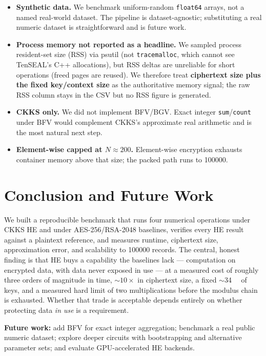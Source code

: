\documentclass[11pt,a4paper]{article}
\begin{document}
\begin{itemize}[leftmargin=1.4em,itemsep=1pt]
  \item \textbf{Synthetic data.} We benchmark uniform-random \texttt{float64}
    arrays, not a named real-world dataset. The pipeline is dataset-agnostic;
    substituting a real numeric dataset is straightforward and is future work.
  \item \textbf{Process memory not reported as a headline.} We sampled process
    resident-set size (RSS) via psutil (not \texttt{tracemalloc}, which cannot
    see TenSEAL's C++ allocations), but RSS deltas are unreliable for short
    operations (freed pages are reused). We therefore treat \textbf{ciphertext
    size plus the fixed key/context size} as the authoritative memory signal; the
    raw RSS column stays in the CSV but no RSS figure is generated.
  \item \textbf{CKKS only.} We did not implement BFV/BGV. Exact integer
    \texttt{sum}/\texttt{count} under BFV would complement CKKS's approximate real
    arithmetic and is the most natural next step.
  \item \textbf{Element-wise capped at $N\approx200$.} Element-wise encryption
    exhausts container memory above that size; the packed path runs to
    \num{100000}.
\end{itemize}

\section{Conclusion and Future Work}

We built a reproducible benchmark that runs four numerical operations under CKKS
HE and under AES-256/RSA-2048 baselines, verifies every HE result against a
plaintext reference, and measures runtime, ciphertext size, approximation error,
and scalability to \num{100000} records. The central, honest finding is that HE
buys a capability the baselines lack --- computation on encrypted data, with data
never exposed in use --- at a measured cost of roughly three orders of magnitude
in time, $\sim$$10\times$ in ciphertext size, a fixed $\sim$\SI{34}{\mega\byte} of
keys, and a measured hard limit of two multiplications before the modulus chain
is exhausted. Whether that trade is acceptable depends entirely on whether
protecting data \emph{in use} is a requirement.

\textbf{Future work:} add BFV for exact integer aggregation; benchmark a real
public numeric dataset; explore deeper circuits with bootstrapping and
alternative parameter sets; and evaluate GPU-accelerated HE backends.
\end{document}
